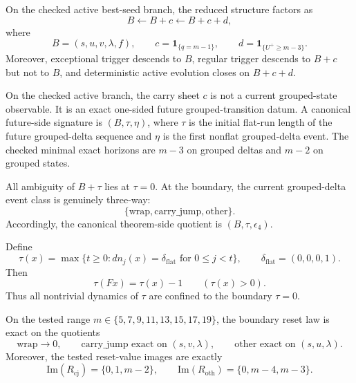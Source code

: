 
\begin{theorem}
On the checked active best-seed branch, the reduced structure factors as
\[
B \leftarrow B+c \leftarrow B+c+d,
\]
where
\[
B=(s,u,v,\lambda,f),
\qquad
c=\mathbf 1_{\{q=m-1\}},
\qquad
d=\mathbf 1_{\{U^+\ge m-3\}}.
\]
Moreover, exceptional trigger descends to $B$, regular trigger descends to
$B+c$ but not to $B$, and deterministic active evolution closes on $B+c+d$.
\end{theorem}

\begin{theorem}
On the checked active branch, the carry sheet $c$ is not a current grouped-state
observable. It is an exact one-sided future grouped-transition datum.
A canonical future-side signature is $(B,\tau,\eta)$, where $\tau$ is the
initial flat-run length of the future grouped-delta sequence and $\eta$ is the
first nonflat grouped-delta event. The checked minimal exact horizons are
$m-3$ on grouped deltas and $m-2$ on grouped states.
\end{theorem}

\begin{proposition}
All ambiguity of $B+\tau$ lies at $\tau=0$. At the boundary, the current
grouped-delta event class is genuinely three-way:
\[
\{\mathrm{wrap},\mathrm{carry\_jump},\mathrm{other}\}.
\]
Accordingly, the canonical theorem-side quotient is $(B,\tau,\epsilon_4)$.
\end{proposition}

\begin{theorem}
Define
\[
\tau(x)=\max\{t\ge 0: dn_j(x)=\delta_{\mathrm{flat}}\text{ for }0\le j<t\},
\qquad
\delta_{\mathrm{flat}}=(0,0,0,1).
\]
Then
\[
\tau(Fx)=\tau(x)-1 \qquad (\tau(x)>0).
\]
Thus all nontrivial dynamics of $\tau$ are confined to the boundary $\tau=0$.

On the tested range $m\in\{5,7,9,11,13,15,17,19\}$, the boundary reset law is
exact on the quotients
\[
\mathrm{wrap}\to 0,
\qquad
\mathrm{carry\_jump}\text{ exact on }(s,v,\lambda),
\qquad
\mathrm{other}\text{ exact on }(s,u,\lambda).
\]
Moreover, the tested reset-value images are exactly
\[
\mathrm{Im}(R_{\mathrm{cj}})=\{0,1,m-2\},
\qquad
\mathrm{Im}(R_{\mathrm{oth}})=\{0,m-4,m-3\}.
\]
\end{theorem}


